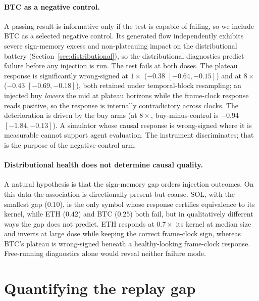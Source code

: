 \documentclass[sigconf,anonymous]{acmart}
\begin{document}
\paragraph{BTC as a negative control.} A passing result is informative only if the test is capable of failing, so we include BTC as a selected negative control. Its generated flow independently exhibits severe sign-memory excess and non-plateauing impact on the distributional battery (Section~\ref{sec:distributional}), so the distributional diagnostics predict failure before any injection is run. The test fails at both doses. The plateau response is significantly wrong-signed at $1\times$ ($-0.38$ $[-0.64, -0.15]$) and at $8\times$ ($-0.43$ $[-0.69, -0.18]$), both retained under temporal-block resampling; an injected buy \emph{lowers} the mid at plateau horizons while the frame-clock response reads positive, so the response is internally contradictory across clocks. The deterioration is driven by the buy arms (at $8\times$, buy-minus-control is $-0.94$ $[-1.84, -0.13]$). A simulator whose causal response is wrong-signed where it is measurable cannot support agent evaluation. The instrument discriminates; that is the purpose of the negative-control arm.

\paragraph{Distributional health does not determine causal quality.} A natural hypothesis is that the sign-memory gap orders injection outcomes. On this data the association is directionally present but coarse. SOL, with the smallest gap ($0.10$), is the only symbol whose response certifies equivalence to its kernel, while ETH ($0.42$) and BTC ($0.25$) both fail, but in qualitatively different ways the gap does not predict. ETH responds at $0.7\times$ its kernel at median size and inverts at large dose while keeping the correct frame-clock sign, whereas BTC's plateau is wrong-signed beneath a healthy-looking frame-clock response. Free-running diagnostics alone would reveal neither failure mode.

\section{Quantifying the replay gap}
\label{sec:replaygap}
\end{document}
